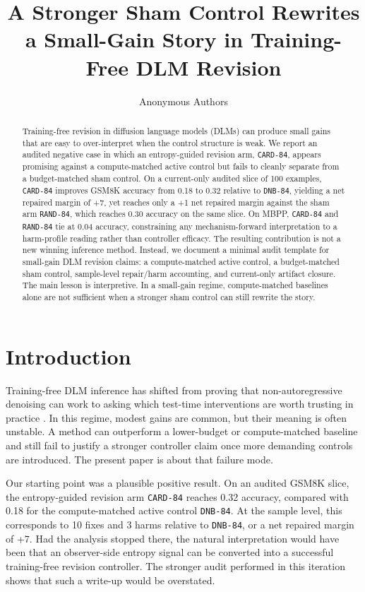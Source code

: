 \documentclass{article}
\title{A Stronger Sham Control Rewrites a Small-Gain Story in Training-Free DLM Revision}
\author{Anonymous Authors}
\begin{document}
\maketitle

\begin{abstract}
Training-free revision in diffusion language models (DLMs) can produce small gains that are easy to over-interpret when the control structure is weak. We report an audited negative case in which an entropy-guided revision arm, \texttt{CARD-84}, appears promising against a compute-matched active control but fails to cleanly separate from a budget-matched sham control. On a current-only audited slice of 100 examples, \texttt{CARD-84} improves GSM8K accuracy from 0.18 to 0.32 relative to \texttt{DNB-84}, yielding a net repaired margin of +7, yet reaches only a +1 net repaired margin against the sham arm \texttt{RAND-84}, which reaches 0.30 accuracy on the same slice. On MBPP, \texttt{CARD-84} and \texttt{RAND-84} tie at 0.04 accuracy, constraining any mechanism-forward interpretation to a harm-profile reading rather than controller efficacy. The resulting contribution is not a new winning inference method. Instead, we document a minimal audit template for small-gain DLM revision claims: a compute-matched active control, a budget-matched sham control, sample-level repair/harm accounting, and current-only artifact closure. The main lesson is interpretive. In a small-gain regime, compute-matched baselines alone are not sufficient when a stronger sham control can still rewrite the story.
\end{abstract}

\section{Introduction}

Training-free DLM inference has shifted from proving that non-autoregressive denoising can work to asking which test-time interventions are worth trusting in practice \citep{radd2023,dpad2025,prophet2025}. In this regime, modest gains are common, but their meaning is often unstable. A method can outperform a lower-budget or compute-matched baseline and still fail to justify a stronger controller claim once more demanding controls are introduced. The present paper is about that failure mode.

Our starting point was a plausible positive result. On an audited GSM8K slice, the entropy-guided revision arm \texttt{CARD-84} reaches 0.32 accuracy, compared with 0.18 for the compute-matched active control \texttt{DNB-84}. At the sample level, this corresponds to 10 fixes and 3 harms relative to \texttt{DNB-84}, or a net repaired margin of +7. Had the analysis stopped there, the natural interpretation would have been that an observer-side entropy signal can be converted into a successful training-free revision controller. The stronger audit performed in this iteration shows that such a write-up would be overstated.
\end{document}
